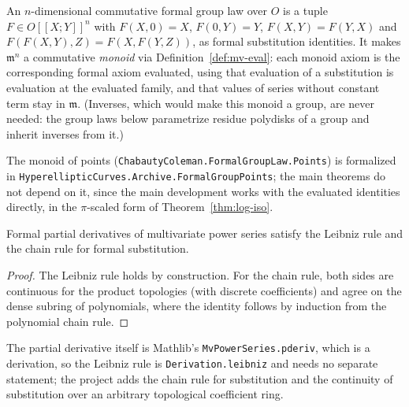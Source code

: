 \begin{definition}
\label{def:fgl}
\leanok
{}
An $n$-dimensional commutative formal group law over $O$ is a tuple
$F \in O[[X;Y]]^n$ with $F(X,0)=X$, $F(0,Y)=Y$, $F(X,Y)=F(Y,X)$ and
$F(F(X,Y),Z)=F(X,F(Y,Z))$, as formal substitution identities. It makes $\mathfrak m^n$ a
commutative \emph{monoid} via Definition~\ref{def:mv-eval}: each monoid axiom is the
corresponding formal axiom evaluated, using that evaluation of a substitution is
evaluation at the evaluated family, and that values of series without constant term stay
in $\mathfrak m$. (Inverses, which would make this monoid a group, are never needed: the
group laws below parametrize residue polydisks of a group and inherit inverses from it.)
\end{definition}

\begin{remark}[Formalization]
The monoid of points (\texttt{ChabautyColeman.FormalGroupLaw.Points}) is formalized in
\texttt{HyperellipticCurves.Archive.FormalGroupPoints}; the main theorems do not depend on it,
since the main development works with the evaluated identities directly, in the $\pi$-scaled
form of Theorem~\ref{thm:log-iso}.
\end{remark}

\begin{lemma}
\label{lem:pderiv}
\leanok
Formal partial derivatives of multivariate power series satisfy the Leibniz rule and the
chain rule for formal substitution.
\end{lemma}
\begin{proof}
\leanok
The Leibniz rule holds by construction. For the chain rule, both sides are continuous for the
product topologies (with discrete coefficients) and agree on the dense subring of polynomials,
where the identity follows by induction from the polynomial chain rule.
\end{proof}

\begin{remark}[Formalization]
The partial derivative itself is Mathlib's \texttt{MvPowerSeries.pderiv}, which is a derivation,
so the Leibniz rule is \texttt{Derivation.leibniz} and needs no separate statement; the project
adds the chain rule for substitution and the continuity of substitution over an arbitrary
topological coefficient ring.
\end{remark}

